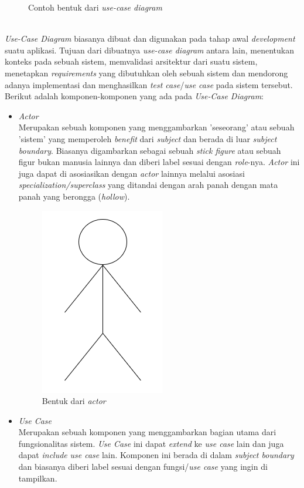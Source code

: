 \documentclass[a4paper]{article}
\begin{document}
\begin{enumerate}
\begin{figure}[h]
        \caption{Contoh bentuk dari \textit{use-case diagram}}
    \end{figure}\\
    \textit{Use-Case Diagram} biasanya dibuat dan digunakan pada tahap awal \textit{development} suatu aplikasi. Tujuan dari dibuatnya \textit{use-case diagram} antara lain, menentukan konteks pada sebuah sistem, memvalidasi arsitektur dari suatu sistem, menetapkan \textit{requirements} yang dibutuhkan oleh sebuah sistem dan mendorong adanya implementasi dan menghasilkan \textit{test case}/\textit{use case} pada sistem tersebut. Berikut adalah komponen-komponen yang ada pada \textit{Use-Case Diagram}:
    \begin{itemize}
        \item \textit{Actor}\\
        Merupakan sebuah komponen yang menggambarkan 'seseorang' atau sebuah 'sistem' yang memperoleh \textit{benefit} dari \textit{subject} dan berada di luar \textit{subject boundary}. Biasanya digambarkan sebagai sebuah \textit{stick figure} atau sebuah figur bukan manusia lainnya dan diberi label sesuai dengan \textit{role}-nya. \textit{Actor} ini juga dapat di asosiasikan dengan \textit{actor} lainnya melalui asosiasi \textit{specialization/superclass} yang ditandai dengan arah panah dengan mata panah yang berongga (\textit{hollow})\autocite{systemanalysisdesign-use-case-diagram}.
        \begin{figure}[h]
            \centering
            \includegraphics[scale=0.5]{use case - actor.png}
            \caption{Bentuk dari \textit{actor}}
        \end{figure}
        \item \textit{Use Case}\\
        Merupakan sebuah komponen yang menggambarkan bagian utama dari fungsionalitas sistem. \textit{Use Case} ini dapat \textit{extend} ke \textit{use case} lain dan juga dapat \textit{include} \textit{use case} lain. Komponen ini berada di dalam \textit{subject boundary} dan biasanya diberi label sesuai dengan fungsi/\textit{use case} yang ingin di tampilkan\autocite{systemanalysisdesign-use-case-diagram}.

\end{itemize}
\end{enumerate}
\end{document}
